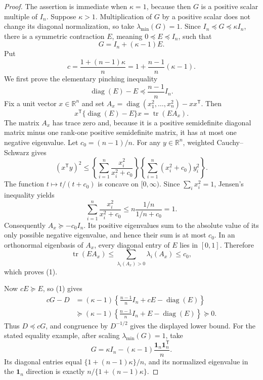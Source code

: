 \documentclass{article}
\begin{document}
\begin{proof}
The assertion is immediate when \(\kappa=1\), because then \(G\) is a positive scalar multiple of \(I_n\).  Suppose \(\kappa>1\).  Multiplication of \(G\) by a positive scalar does not change its diagonal normalization, so take \(\lambda_{\min}(G)=1\).  Since \(I_n\preceq G\preceq\kappa I_n\), there is a symmetric contraction \(E\), meaning \(0\preceq E\preceq I_n\), such that
\[
 G=I_n+(\kappa-1)E.
\]
Put
\[
 c=\frac{1+(n-1)\kappa}{n}
 =1+\frac{n-1}{n}(\kappa-1).
\]
We first prove the elementary pinching inequality
\[
 \operatorname{diag}(E)-E\preceq\frac{n-1}{n}I_n. \tag{1}
\]
Fix a unit vector \(x\in\mathbb R^n\) and set
\(A_x=\operatorname{diag}(x_1^2,\ldots,x_n^2)-xx^{\mathsf T}\).  Then
\[
 x^{\mathsf T}\{\operatorname{diag}(E)-E\}x
 =\operatorname{tr}(EA_x).
\]
The matrix \(A_x\) has trace zero and, because it is a positive semidefinite diagonal matrix minus one rank-one positive semidefinite matrix, it has at most one negative eigenvalue.  Let \(c_0=(n-1)/n\).  For any \(y\in\mathbb R^n\), weighted Cauchy--Schwarz gives
\[
 (x^{\mathsf T}y)^2
 \le
 \left\{\sum_{i=1}^n\frac{x_i^2}{x_i^2+c_0}\right\}
 \left\{\sum_{i=1}^n(x_i^2+c_0)y_i^2\right\}.
\]
The function \(t\mapsto t/(t+c_0)\) is concave on \([0,\infty)\).  Since \(\sum_i x_i^2=1\), Jensen's inequality yields
\[
 \sum_{i=1}^n\frac{x_i^2}{x_i^2+c_0}
 \le n\frac{1/n}{1/n+c_0}=1.
\]
Consequently \(A_x\succeq-c_0I_n\).  Its positive eigenvalues sum to the absolute value of its only possible negative eigenvalue, and hence their sum is at most \(c_0\).  In an orthonormal eigenbasis of \(A_x\), every diagonal entry of \(E\) lies in \([0,1]\).  Therefore
\[
 \operatorname{tr}(EA_x)\le\sum_{\lambda_i(A_x)>0}\lambda_i(A_x)\le c_0,
\]
which proves (1).

Now \(cE\succeq E\), so (1) gives
\[
\begin{aligned}
 cG-D
 &=(\kappa-1)\left\{\frac{n-1}{n}I_n+cE-\operatorname{diag}(E)\right\}\\
 &\succeq(\kappa-1)\left\{\frac{n-1}{n}I_n+E-\operatorname{diag}(E)\right\}\succeq0.
\end{aligned}
\]
Thus \(D\preceq cG\), and congruence by \(D^{-1/2}\) gives the displayed lower bound.  For the stated equality example, after scaling \(\lambda_{\min}(G)=1\), take
\[
 G=\kappa I_n-(\kappa-1)\frac{\mathbf 1_n\mathbf 1_n^{\mathsf T}}{n}.
\]
Its diagonal entries equal \(\{1+(n-1)\kappa\}/n\), and its normalized eigenvalue in the \(\mathbf 1_n\) direction is exactly \(n/\{1+(n-1)\kappa\}\).
\end{proof}
\end{document}
